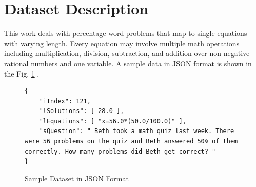 \documentclass[document.tex]{subfiles}
\begin{document}

\section{Dataset Description}
This work deals with percentage word problems that map to single equations with varying length. Every equation may involve multiple math operations including multiplication, division, subtraction, and addition over non-negative rational numbers and one variable. A sample data in JSON format is shown in the Fig. \ref{fig:data} .
\begin{figure}[H]
	\begin{center}
		\begin{lstlisting}
{
	"iIndex": 121,
	"lSolutions": [ 28.0 ],
	"lEquations": [ "x=56.0*(50.0/100.0)" ],
	"sQuestion": " Beth took a math quiz last week. There were 56 problems on the quiz and Beth answered 50% of them correctly. How many problems did Beth get correct? "
}
		\end{lstlisting}
	\end{center}
	\caption{Sample Dataset in JSON Format}
	\label{fig:data}
\end{figure}
\end{document}
